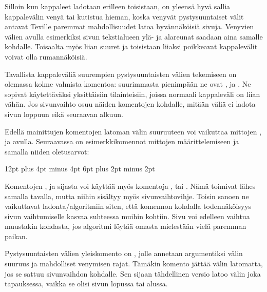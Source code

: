 \begin{koodilohkosis}
\setlength{\parskip}{1.3ex plus .2ex minus .1ex}
\end{koodilohkosis}

\noindent
Silloin kun kappaleet ladotaan erilleen toisistaan, on yleensä hyvä
sallia kappalevälin venyä tai kutistua hieman, koska venyvät
pystysuuntaiset välit antavat Texille paremmat mahdollisuudet latoa
hyvännäköisiä sivuja. Venyvien välien avulla esimerkiksi sivun
tekstialueen ylä- ja alareunat saadaan aina samalle kohdalle. Toisaalta
myös liian suuret ja toisistaan liiaksi poikkeavat kappalevälit voivat
olla rumannäköisiä.

Tavallista kappaleväliä suurempien pystysuuntaisten välien tekemiseen on
olemassa kolme valmista komentoa: suurimmasta pienimpään ne ovat
,  ja . Ne
sopivat käytettäväksi yksittäisiin tilainteisiin, joissa normaali
kappaleväli on liian vähän. Jos sivunvaihto osuu näiden komentojen
kohdalle, mitään väliä ei ladota sivun loppuun eikä seuraavan alkuun.

Edellä mainittujen komentojen latoman välin suuruuteen voi vaikuttaa
mittojen ,  ja
 avulla. Seuraavassa on esimerkkikomennot
mittojen määrittelemiseen ja samalla niiden oletusarvot:

\begin{koodilohkosis}
\setlength{\bigskipamount} {12pt plus 4pt minus 4pt}
\setlength{\medskipamount}  {6pt plus 2pt minus 2pt}
\setlength{\smallskipamount}{3pt plus 1pt minus 1pt}
\end{koodilohkosis}

\noindent
Komentojen ,  ja 
sijasta voi käyttää myös komentoja ,
 tai . Nämä toimivat lähes
samalla tavalla, mutta niihin sisältyy myös sivunvaihtovihje. Toisin
sanoen ne vaikuttavat ladonta\-/algoritmiin siten, että komennon
kohdalla todennäköisyys sivun vaihtumiselle kasvaa suhteessa muihin
kohtiin. Sivu voi edelleen vaihtua muustakin kohdasta, jos algoritmi
löytää omasta mielestään vielä paremman paikan.

Pystysuuntaisten välien yleiskomento on , jolle
annetaan argumentiksi välin suuruus ja mahdolliset venymisen rajat.
Tämäkin komento jättää välin latomatta, jos se sattuu sivunvaihdon
kohdalle. Sen sijaan tähdellinen versio  latoo välin
joka tapauksessa, vaikka se olisi sivun lopussa tai alussa.

